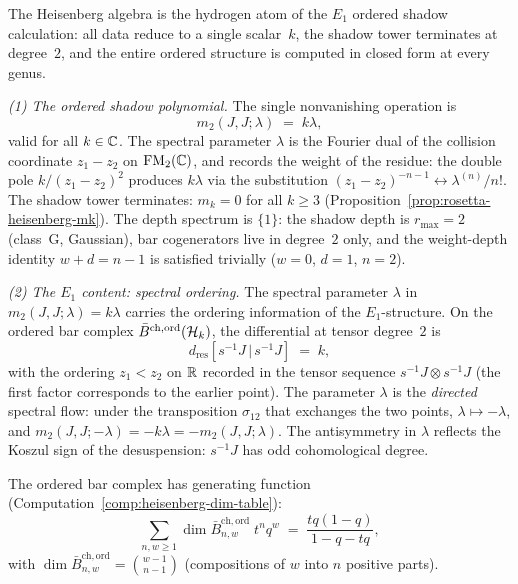 \begin{computation}%
\label{comp:heisenberg-e1-ordered-shadow}%
%
%
%
The Heisenberg algebra is the hydrogen atom of the $E_1$ ordered
shadow calculation: all data reduce to a single scalar~$k$, the shadow
tower terminates at degree~$2$, and the entire ordered structure is
computed in closed form at every genus.

\smallskip
\noindent
\emph{(1) The ordered shadow polynomial.}
The single nonvanishing operation is
\begin{equation}\label{eq:e1-shadow-m2}
m_2(J,J;\lambda) \;=\; k\lambda,
\end{equation}
valid for all $k \in \mathbb{C}$. The spectral parameter $\lambda$ is the
Fourier dual of the collision coordinate $z_1 - z_2$ on
$\mathrm{FM}_2(\mathbb{C})$, and records the weight of the residue: the double pole
$k/(z_1 - z_2)^2$ produces $k\lambda$ via the substitution
$(z_1 - z_2)^{-n-1} \leftrightarrow \lambda^{(n)}/n!$. The shadow
tower terminates: $m_k = 0$ for all $k \ge 3$
(Proposition~\ref{prop:rosetta-heisenberg-mk}). The depth spectrum is
$\{1\}$: the shadow depth is $r_{\max} = 2$ (class~G, Gaussian),
bar cogenerators live in degree~$2$ only, and the weight-depth
identity $w + d = n - 1$ is satisfied trivially ($w = 0$, $d = 1$,
$n = 2$).

\smallskip
\noindent
\emph{(2) The $E_1$ content: spectral ordering.}
The spectral parameter $\lambda$ in $m_2(J,J;\lambda) = k\lambda$
carries the ordering information of the $E_1$-structure. On the
ordered bar complex $\bar{B}^{\mathrm{ch,ord}}(\mathcal{H}_k)$, the
differential at tensor degree~$2$ is
\[
d_{\mathrm{res}}[s^{-1}J \,|\, s^{-1}J]
\;=\; k,
\]
with the ordering $z_1 < z_2$ on $\mathbb{R}$ recorded in the tensor
sequence $s^{-1}J \otimes s^{-1}J$ (the first factor corresponds to
the earlier point). The parameter $\lambda$ is the \emph{directed}
spectral flow: under the transposition $\sigma_{12}$ that exchanges
the two points, $\lambda \mapsto -\lambda$, and
$m_2(J,J;-\lambda) = -k\lambda = -m_2(J,J;\lambda)$. The
antisymmetry in $\lambda$ reflects the Koszul sign of the
desuspension: $s^{-1}J$ has odd cohomological degree.

The ordered bar complex has generating function
(Computation~\ref{comp:heisenberg-dim-table}):
\[
\sum_{n,w \ge 1}
\dim\bar{B}^{\mathrm{ch,ord}}_{n,w}\; t^n q^w
\;=\;
\frac{tq(1-q)}{1-q-tq},
\]
with $\dim\bar{B}^{\mathrm{ch,ord}}_{n,w} = \binom{w-1}{n-1}$
(compositions of $w$ into $n$ positive parts).


\end{computation}
